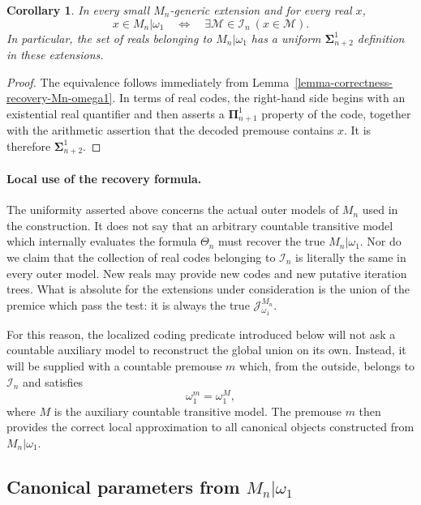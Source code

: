 \documentclass[a4paper,11pt]{article}
\newtheorem{corollary}[theorem]{Corollary}
\begin{document}
\begin{corollary}
\label{corollary-projective-recovery-reals-Mn-omega1}
In every small $M_n$-generic extension and for every real $x$,
\[
   x\in M_n|\omega_1
   \quad\Longleftrightarrow\quad
   \exists\mathcal M\in\mathcal I_n\ (x\in\mathcal M).
\]
In particular, the set of reals belonging to
$M_n|\omega_1$ has a uniform $\boldsymbol{\Sigma}^1_{n+2}$
definition in these extensions.
\end{corollary}

\begin{proof}
The equivalence follows immediately from
Lemma~\ref{lemma-correctness-recovery-Mn-omega1}.  In terms of real codes, the
right-hand side begins with an existential real quantifier and then asserts a
$\boldsymbol{\Pi}^1_{n+1}$ property of the code, together with the arithmetic
assertion that the decoded premouse contains $x$.  It is therefore
$\boldsymbol{\Sigma}^1_{n+2}$.
\end{proof}

\paragraph{Local use of the recovery formula.}
The uniformity asserted above concerns the actual outer models of $M_n$ used
in the construction.  It does not say that an arbitrary countable transitive
model which internally evaluates the formula $\Theta_n$ must recover the true
$M_n|\omega_1$.  Nor do we claim that the collection of real codes
belonging to $\mathcal I_n$ is literally the same in every outer model.  New
reals may provide new codes and new putative iteration trees.  What is
absolute for the extensions under consideration is the union of the premice
which pass the test: it is always the true
$\mathcal J^{M_n}_{\omega_1}$.

For this reason, the localized coding predicate introduced below will not ask
a countable auxiliary model to reconstruct the global union on its own.
Instead, it will be supplied with a countable premouse $m$ which, from the
outside, belongs to $\mathcal I_n$ and satisfies
\[
   \omega_1^m=\omega_1^M,
\]
where $M$ is the auxiliary countable transitive model.  The premouse $m$ then
provides the correct local approximation to all canonical objects constructed
from $M_n|\omega_1$.

\subsection[Canonical parameters from Mn restricted to omega1]{Canonical parameters from $M_n|\omega_1$}
\label{subsection-canonical-parameters-Mn}
\end{document}
